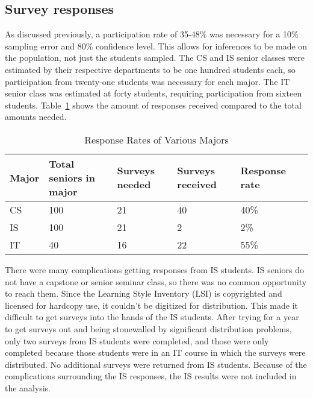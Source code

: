 \subsection{Survey responses}
As discussed previously, a participation rate of 35-48\% was necessary for a 10\% sampling error and 80\% confidence level. This allows for inferences to be made on the population, not just the students sampled. The CS and IS senior classes were estimated by their respective departments to be one hundred students each, so participation from twenty-one students was necessary for each major. The IT senior class was estimated at forty students, requiring participation from sixteen students. Table~\ref{tab:c-response-rates} shows the amount of responses received compared to the total amounts needed.

\begin{table}[h!]
  \centering
  \begin{tabular}{llllll}
    \toprule
    Major & Total seniors in major & Surveys needed & Surveys received & Response rate\\
    \midrule
    CS    & 100                    & 21             & 40               & 40\%\\
    IS    & 100                    & 21             & 2                & 2\%\\
    IT    & 40                     & 16             & 22               & 55\%\\
    \bottomrule
  \end{tabular}
  \ifdim\wd\tempbox<\TPTminimum\relax \tempwidth=\TPTminimum\relax
  \else\tempwidth=\wd\tempbox
  \fi
  \begin{minipage}{\tempwidth}\centering
  \caption[Sample sizes]{Response Rates of Various Majors}
  \label{tab:c-response-rates}
  \usebox{\tempbox}
  \end{minipage}
\end{table}

There were many complications getting responses from IS students. IS seniors do not have a capstone or senior seminar class, so there was no common opportunity to reach them. Since the Learning Style Inventory (LSI) is copyrighted and licensed for hardcopy use, it couldn't be digitized for distribution. This made it difficult to get surveys into the hands of the IS students. After trying for a year to get surveys out and being stonewalled by significant distribution problems, only two surveys from IS students were completed, and those were only completed because those students were in an IT course in which the surveys were distributed. No additional surveys were returned from IS students. Because of the complications surrounding the IS responses, the IS results were not included in the analysis.

